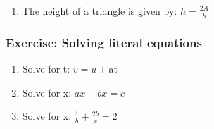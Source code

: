 {\begin{mdframed}[linewidth=4, leftmargin=40, rightmargin=40]
\begin{exercise}
\begin{enumerate}[noitemsep, label=\textbf{Step} \textbf{\arabic*}. ]
{\begin{equation}
      \end{equation}
    }{%
    \setlength{\mymathboxwidth}{\columnwidth}
      \addtolength{\mymathboxwidth}{-48pt}
    \par\vspace{12pt}\noindent\begin{minipage}{\columnwidth}
    \parbox[t]{\mymathboxwidth}{\large\begin{math}
    A=\frac{1}{2}bÃ---h2A=bÃ---h\left(\mathrm{multiply\; both\; sides\; by\; 2}\right)\frac{2A}{b}=h\left(\mathrm{divide\; both\; sides\; by\; b}\right)\end{math}}\hfill
    \parbox[t]{48pt}{\raggedleft 
    (9.83)}
    \end{minipage}\vspace{12pt}\par
    }%
    
        
        
        \item  
        \label{m39258*id1625465489}The height of a triangle is given by: \begin{math}h=\frac{2A}{b}\end{math}
 \par 
        \end{enumerate}
         

    \end{exercise}
    \end{mdframed}
    }
    \noindent
  
\label{m39258*id978342}
            \subsubsection{Exercise: Solving literal equations}
            \nopagebreak
             

\label{m39258*id9734}\begin{enumerate}[noitemsep, label=\textbf{\arabic*}. ] 
            \item Solve for t:
\begin{math}v=u+\mathrm{at}\end{math}\newline
            
\item Solve for x:
\begin{math}ax-bx=c\end{math}\newline
            
\item  Solve for x:
\begin{math}\frac{1}{b}+\frac{2b}{x}=2\end{math}
\newline
            
\end{enumerate}
        


